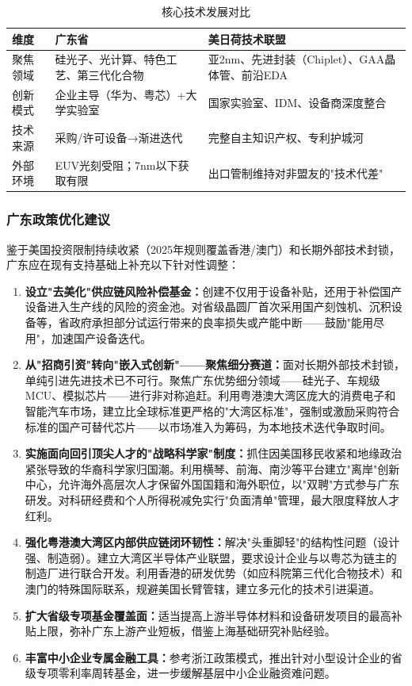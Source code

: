 \documentclass[12pt,a4paper]{article}
\newcommand{\tableHeaderRow}{\rowcolor{tealPrimary}\color{white}}
\newcommand{\tableOddRow}{\rowcolor{mintBG}}
\newcommand{\tableEvenRow}{\rowcolor{white}}
\begin{document}
\begin{table}[H]
\centering
\caption{核心技术发展对比}
\label{tab:policy_tech}
\begin{tabular}{p{2.5cm}p{5cm}p{5cm}}
\toprule
\tableHeaderRow
\textbf{维度} & \textbf{广东省} & \textbf{美日荷技术联盟} \\
\midrule
\tableOddRow 聚焦领域 & 硅光子、光计算、特色工艺、第三代化合物 & 亚2nm、先进封装（Chiplet）、GAA晶体管、前沿EDA \\
\tableEvenRow 创新模式 & 企业主导（华为、粤芯）+大学实验室 & 国家实验室、IDM、设备商深度整合 \\
\tableOddRow 技术来源 & 采购/许可设备→渐进迭代 & 完整自主知识产权、专利护城河 \\
\tableEvenRow 外部环境 & EUV光刻受阻；7nm以下获取有限 & 出口管制维持对非盟友的"技术代差" \\
\bottomrule
\end{tabular}
\end{table}

\subsubsection{广东政策优化建议}

鉴于美国投资限制持续收紧（2025年规则覆盖香港/澳门）和长期外部技术封锁，广东应在现有支持基础上补充以下针对性调整：

\begin{enumerate}[label=(\arabic*)]
    \item \textbf{设立"去美化"供应链风险补偿基金：}创建不仅用于设备补贴，还用于补偿国产设备进入生产线的风险的资金池。对省级晶圆厂首次采用国产刻蚀机、沉积设备等，省政府承担部分试运行带来的良率损失或产能中断——鼓励"能用尽用"，加速国产设备迭代。
    \item \textbf{从"招商引资"转向"嵌入式创新"——聚焦细分赛道：}面对长期外部技术封锁，单纯引进先进技术已不可行。聚焦广东优势细分领域——硅光子、车规级MCU、模拟芯片——进行非对称追赶。利用粤港澳大湾区庞大的消费电子和智能汽车市场，建立比全球标准更严格的"大湾区标准"，强制或激励采购符合标准的国产可替代芯片——以市场准入为筹码，为本地技术迭代争取时间。
    \item \textbf{实施面向回引顶尖人才的"战略科学家"制度：}抓住因美国移民收紧和地缘政治紧张导致的华裔科学家归国潮。利用横琴、前海、南沙等平台建立"离岸"创新中心，允许海外高层次人才保留外国国籍和海外职位，以"双聘"方式参与广东研发。对科研经费和个人所得税减免实行"负面清单"管理，最大限度释放人才红利。
    \item \textbf{强化粤港澳大湾区内部供应链闭环韧性：}解决"头重脚轻"的结构性问题（设计强、制造弱）。建立大湾区半导体产业联盟，要求设计企业与以粤芯为链主的制造厂进行联合开发。利用香港的研发优势（如应科院第三代化合物技术）和澳门的特殊国际联系，规避美国长臂管辖，建立多元化的技术引进渠道。
    \item \textbf{扩大省级专项基金覆盖面：}适当提高上游半导体材料和设备研发项目的最高补贴上限，弥补广东上游产业短板，借鉴上海基础研究补贴经验。
    \item \textbf{丰富中小企业专属金融工具：}参考浙江政策模式，推出针对小型设计企业的省级专项零利率周转基金，进一步缓解基层中小企业融资难问题。
\end{enumerate}
\end{document}

